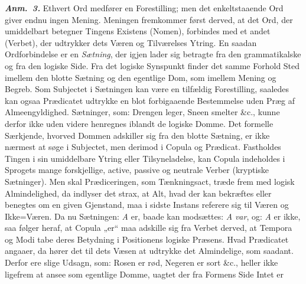 \documentclass[12pt]{book}
\newcommand{\anm}[1]{\emph{\textbf{Anm.~#1.}}}
\newcommand{\opage}[1]{\marginnote{\footnotesize\textit{[#1]}}}
\begin{document}
\anm{3} Ethvert Ord medfører en Forestilling; men
\opage{39} det enkeltstaaende Ord giver endnu ingen Mening. Meningen fremkommer først
derved, at det Ord, der umiddelbart betegner Tingens Existens (Nomen), forbindes
med et andet (Verbet), der udtrykker dets Væren og Tilværelses Ytring. En saadan
Ordforbindelse er en \emph{Sætning}, der igjen lader sig betragte fra den
grammatikalske og fra den logiske Side. Fra det logiske Synspunkt finder det
samme Forhold Sted imellem den blotte Sætning og den egentlige Dom, som imellem
Mening og Begreb. Som Subjectet i Sætningen kan være en tilfældig Forestilling,
saaledes kan ogsaa Prædicatet udtrykke en blot forbigaaende Bestemmelse uden
Præg af Almeengyldighed.
Sætninger, som: Drengen leger, Sneen smelter \&c., kunne
derfor ikke uden videre henregnes iblandt de logiske Domme. Det formelle
Særkjende, hvorved Dommen adskiller sig fra den blotte Sætning, er ikke nærmest
at søge i Subjectet, men derimod i Copula og Prædicat. Fastholdes Tingen i sin
umiddelbare Ytring eller Tilsyneladelse, kan Copula indeholdes i Sprogets mange
forskjellige, active, passive og neutrale Verber (kryptiske Sætninger). Men skal
Prædiceringen, som Tænkningsact, træde frem med logisk Almindelighed, da indlyser
det strax, at Alt, hvad der kan bekræftes eller benegtes om en given Gjenstand,
maa i sidste Instans referere sig til Væren og Ikke=Væren. Da nu Sætningen:
\textit{A} er, baade kan modsættes: \textit{A} \emph{var}, og: \textit{A} er
ikke, saa følger heraf, at Copula „er“ maa adskille sig fra Verbet derved, at
Tempora og Modi tabe deres Betydning i Positionens logiske Præsens. Hvad
Prædicatet angaaer, da hører det til dets Væsen at udtrykke det Almindelige, som
saadant. Derfor ere slige Udsagn, som: Rosen er rød, Negeren er sort \&c., heller
ikke ligefrem at ansee som egentlige Domme, uagtet der fra Formens Side Intet er
\end{document}
